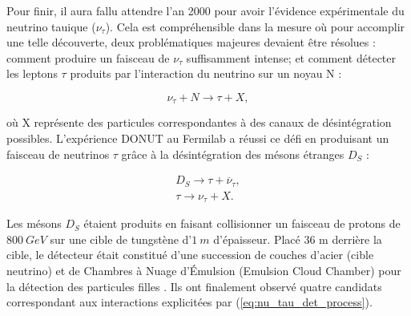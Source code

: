 Pour finir, il aura fallu attendre l'an 2000 pour avoir l'évidence expérimentale du neutrino tauique ($\nu_\tau$). Cela est compréhensible dans la mesure où pour accomplir une telle découverte, deux problématiques majeures devaient être résolues : comment produire un faisceau de $\nu_\tau$ suffisamment intense; et comment détecter les leptons $\tau$ produits par l'interaction du neutrino sur un noyau N :

\begin{equation}
\label{eq:nu_tau_det_process}
    \nu_\tau + N \rightarrow \tau + X,
\end{equation}

\bigbreak

où X représente des particules correspondantes à des canaux de désintégration possibles. L'expérience DONUT au Fermilab a réussi ce défi en produisant un faisceau de neutrinos $\tau$ grâce à la désintégration des mésons étranges $D_S$ :

\begin{equation}
    \begin{gathered}
        D_S \rightarrow \tau + \overline{\nu}_\tau,\\
        \tau \rightarrow \nu_\tau + X.
    \end{gathered}
\end{equation}

Les mésons $D_S$ étaient produits en faisant collisionner un faisceau de protons de $\SI{800}{GeV}$ sur une cible de tungstène d'$\SI{1}{m}$ d'épaisseur.  Placé 36 m derrière la cible, le détecteur était constitué d'une succession de couches d'acier (cible neutrino) et de Chambres à Nuage d'Émulsion (Emulsion Cloud Chamber) pour la détection des particules filles \cite{Kodama:2000mp}. Ils ont finalement observé quatre candidats correspondant aux interactions explicitées par (\ref{eq:nu_tau_det_process}).\\

